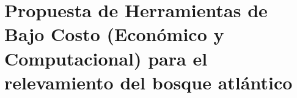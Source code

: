 \section{ Propuesta de Herramientas de Bajo Costo (Económico y Computacional) para el relevamiento del bosque atlántico}
